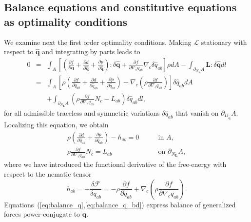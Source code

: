 \documentclass[12pt]{iopart}
\begin{document}
	\subsection{Balance equations and constitutive equations as optimality conditions}\label{sec_2}
	
	We examine next the first order optimality conditions. Making $\mathcal{L}$ stationary with respect to $\widehat{\bm{q}}$ and integrating by parts leads to
	\begin{eqnarray} 
		0&=&\int_A \left[ \left(\frac{\partial  f}{\partial \bm{q}} + \frac{\partial d}{\partial \widehat{\bm{q}}}+ \frac{\partial p}{\partial \widehat{\bm{q}}} \right) : \delta \widehat{\bm{q}} + \frac{\partial f}{\partial \nabla_c q_{ab}} \nabla_c \delta \widehat{q}_{ab} \right] \rho dA - \int_{\partial_{N_{\bm{L}}}A} \bm{L}:\delta\widehat{\bm{q}} dl \nonumber\\
		&=&\int_A \left[\rho \left(\frac{\partial  f}{\partial {q}_{ab}} + \frac{\partial d}{\partial \widehat{{q}}_{ab}}+ \frac{\partial p}{\partial \widehat{{q}}_{ab}} \right) - \nabla_c \left(\rho \frac{\partial f}{\partial \nabla_c {q}_{ab}} \right)   \right] \delta \widehat{{q}}_{ab}  dA \nonumber\\
		&&+ \int_{\partial_{N_{\bm{L}}}A} \left(\rho \frac{\partial f}{\partial \nabla_c {q}_{ab}} N_c -{L}_{ab}\right)\delta\widehat{{q}}_{ab} dl, \label{eq:var_q}
	\end{eqnarray}
	for all admissible traceless and symmetric variations $\delta\widehat{{q}}_{ab}$ that vanish on $\partial_{D_{\widehat{\bm{q}}}} A $. Localizing this equation, we obtain
	\begin{eqnarray} 
		\label{eq:balance_q} 
		\rho \left(\frac{\partial d}{\partial \widehat{{q}}_{ab}}+ \frac{\partial p}{\partial \widehat{{q}}_{ab}} \right) - h_{ab} = 0  \qquad & \text{in } A ,\\
		\rho \frac{\partial f}{\partial \nabla_c {q}_{ab}} N_c = {L}_{ab} \qquad & \text{on } \partial_{N_{\bm{L}}} A, \label{eq:balance_q_bd} 
	\end{eqnarray}
where we have introduced the functional derivative of the free-energy with respect to the nematic tensor
\begin{equation}
\label{nem_field}
h_{ab} = -\frac{\delta \mathcal{F}}{\delta {q}_{ab}} = -\rho \frac{\partial f}{\partial {q}_{ab}} + \nabla_c \left(\rho \frac{\partial f}{\partial \nabla_c {q}_{ab}}\right). 
\end{equation}
Equations~(\ref{eq:balance_q},\ref{eq:balance_q_bd}) express balance of generalized forces power-conjugate to $\widehat{\bm{q}}$. 
	
\end{document}
